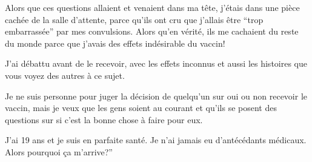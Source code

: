 {Alors que ces questions allaient et venaient dans ma tête, j'étais dans une
pièce cachée de la salle d'attente, parce qu'ils ont cru que j'allais être “trop
embarrassée” par mes convulsions. Alors qu'en vérité, ils me cachaient du reste
du monde parce que j'avais des effets indésirable du vaccin!

J'ai débattu avant de le recevoir, avec les effets inconnus et aussi les
histoires que vous voyez des autres à ce sujet.

Je ne suis personne pour juger la décision de quelqu'un sur oui ou non recevoir
le vaccin, mais je veux que les gens soient au courant et qu'ils se posent des
questions sur si c'est la bonne chose à faire pour eux.

J'ai 19 ans et je suis en parfaite santé. Je n'ai jamais eu d'antécédants
médicaux. Alors pourquoi ça m'arrive?”

}
